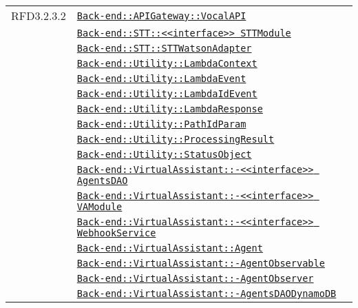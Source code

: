 \begin{longtable}{|>{\centering}m{3cm}|m{10cm}<{\centering}|}
RFD3.2.3.2 & \hyperref[Back-end::APIGateway::VocalAPI]{\texttt{Back-end::APIGateway::VocalAPI}}\\
& \hyperref[Back-end::STT::<<interface>> STTModule]{\texttt{Back-end::STT::<<interface>> STTModule}}\\
& \hyperref[Back-end::STT::STTWatsonAdapter]{\texttt{Back-end::STT::STTWatsonAdapter}}\\
& \hyperref[Back-end::Utility::LambdaContext]{\texttt{Back-end::Utility::LambdaContext}}\\
& \hyperref[Back-end::Utility::LambdaEvent]{\texttt{Back-end::Utility::LambdaEvent}}\\
& \hyperref[Back-end::Utility::LambdaIdEvent]{\texttt{Back-end::Utility::LambdaIdEvent}}\\
& \hyperref[Back-end::Utility::LambdaResponse]{\texttt{Back-end::Utility::LambdaResponse}}\\
& \hyperref[Back-end::Utility::PathIdParam]{\texttt{Back-end::Utility::PathIdParam}}\\
& \hyperref[Back-end::Utility::ProcessingResult]{\texttt{Back-end::Utility::ProcessingResult}}\\
& \hyperref[Back-end::Utility::StatusObject]{\texttt{Back-end::Utility::StatusObject}}\\
& \hyperref[Back-end::VirtualAssistant::<<interface>> AgentsDAO]{\texttt{Back-end::VirtualAssistant::-\linebreak <<interface>> AgentsDAO}}\\
& \hyperref[Back-end::VirtualAssistant::<<interface>> VAModule]{\texttt{Back-end::VirtualAssistant::-\linebreak <<interface>> VAModule}}\\
& \hyperref[Back-end::VirtualAssistant::<<interface>> WebhookService]{\texttt{Back-end::VirtualAssistant::-\linebreak <<interface>> WebhookService}}\\
& \hyperref[Back-end::VirtualAssistant::Agent]{\texttt{Back-end::VirtualAssistant::Agent}}\\
& \hyperref[Back-end::VirtualAssistant::AgentObservable]{\texttt{Back-end::VirtualAssistant::-\linebreak AgentObservable}}\\
& \hyperref[Back-end::VirtualAssistant::AgentObserver]{\texttt{Back-end::VirtualAssistant::-\linebreak AgentObserver}}\\
& \hyperref[Back-end::VirtualAssistant::AgentsDAODynamoDB]{\texttt{Back-end::VirtualAssistant::-\linebreak AgentsDAODynamoDB}}\\

\end{longtable}
